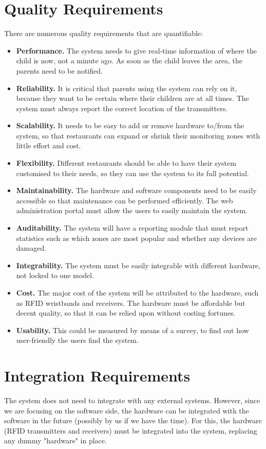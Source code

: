 \documentclass[11pt,titlepage]{article}
\begin{document}
\section{Quality Requirements}
There are numerous quality requirements that are quantifiable:
\begin{itemize}
\item \textbf{Performance.} The system needs to give real-time information of where the child is now, not a minute ago. As soon as the child leaves the area, the parents need to be notified.
\item \textbf{Reliability.} It is critical that parents using the system can rely on it, because they want to be certain where their children are at all times. The system must always report the correct location of the transmitters.
\item \textbf{Scalability.} It needs to be easy to add or remove hardware to/from the system, so that restaurants can expand or shrink their monitoring zones with little effort and cost.
\item \textbf{Flexibility.} Different restaurants should be able to have their system customised to their needs, so they can use the system to its full potential.
\item \textbf{Maintainability.} The hardware and software components need to be easily accessible so that maintenance can be performed efficiently. The web administration portal must allow the users to easily maintain the system.
\item \textbf{Auditability.} The system will have a reporting module that must report statistics such as which zones are most popular and whether any devices are damaged.
\item \textbf{Integrability.} The system must be easily integrable with different hardware, not locked to one model.
\item \textbf{Cost.} The major cost of the system will be attributed to the hardware, such as RFID wristbands and receivers. The hardware must be affordable but decent quality, so that it can be relied upon without costing fortunes.
\item \textbf{Usability.} This could be measured by means of a survey, to find out how user-friendly the users find the system.
\end{itemize}

\section{Integration Requirements}
The system does not need to integrate with any external systems. However, since we are focusing on the software side, the hardware can be integrated with the software in the future (possibly by us if we have the time). For this, the hardware (RFID transmitters and receivers) must be integrated into the system, replacing any dummy "hardware" in place.
\end{document}
